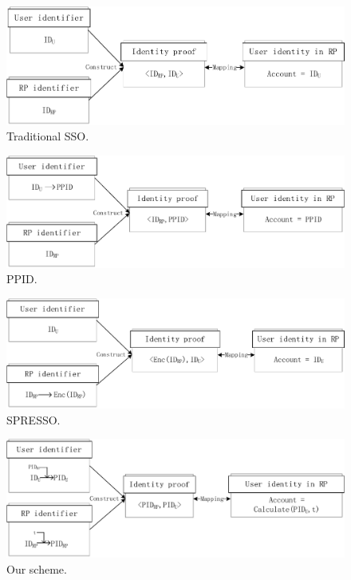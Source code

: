 \begin{figure}
  \centering
  \includegraphics[width=\linewidth]{fig/mapping1.pdf}
  \caption{Traditional SSO.}
  \label{fig:TraditionalSSO}
\end{figure}
\begin{figure}
  \centering
  \includegraphics[width=\linewidth]{fig/mapping2.pdf}
  \caption{PPID.}
  \label{fig:PPID}
\end{figure}
\begin{figure}
  \centering
  \includegraphics[width=\linewidth]{fig/mapping3.pdf}
  \caption{SPRESSO.}
  \label{fig:SPRESSO}
\end{figure}
\begin{figure}
  \centering
  \includegraphics[width=\linewidth]{fig/mapping5.pdf}
  \caption{Our scheme.}
  \label{fig:Ourscheme}
\end{figure}
